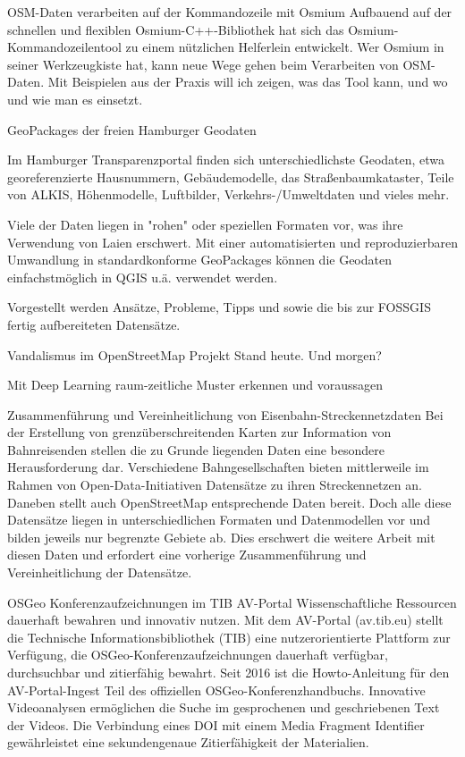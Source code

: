 %
{OSM-Daten verarbeiten auf der Kommandozeile mit Osmium}%
{}%
{Aufbauend auf der schnellen und flexiblen Osmium-C++-Bibliothek hat sich das
Osmium-Kommandozeilentool zu einem nützlichen Helferlein entwickelt. Wer Osmium in seiner
Werkzeugkiste hat, kann neue Wege gehen beim Verarbeiten von OSM-Daten. Mit Beispielen aus der
Praxis will ich zeigen, was das Tool kann, und wo und wie man es einsetzt.}

%
{GeoPackages der freien Hamburger Geodaten}%
{}%
{Im Hamburger Transparenzportal finden sich unterschiedlichste Geodaten, etwa georeferenzierte
  Hausnummern, Gebäudemodelle, das Straßenbaumkataster, Teile von ALKIS, Höhenmodelle, Luftbilder,
  Verkehrs-/Umweltdaten und vieles mehr.

Viele der Daten liegen in "rohen" oder speziellen Formaten vor, was ihre Verwendung von Laien
erschwert. Mit einer automatisierten und reproduzierbaren Umwandlung in standardkonforme GeoPackages
können die Geodaten einfachstmöglich in QGIS u.ä. verwendet werden.

Vorgestellt werden Ansätze, Probleme, Tipps und sowie die bis zur FOSSGIS fertig aufbereiteten
Datensätze.}

%
{Vandalismus im OpenStreetMap Projekt}%
{Stand heute. Und morgen?}%
{}
{}

%
{Mit Deep Learning raum-zeitliche Muster erkennen und voraussagen}%
{}%
{}

%
{Zusammenführung und Vereinheitlichung von Eisenbahn-Streckennetzdaten}%
{}%
{Bei der Erstellung von grenzüberschreitenden Karten zur Information von Bahnreisenden stellen die
zu Grunde liegenden Daten eine besondere Herausforderung dar. Verschiedene Bahngesellschaften bieten
mittlerweile im Rahmen von Open-Data-Initiativen Datensätze zu ihren Streckennetzen an. Daneben
stellt auch OpenStreetMap entsprechende Daten bereit. Doch alle diese Datensätze liegen in
unterschiedlichen Formaten und Datenmodellen vor und bilden jeweils nur begrenzte Gebiete ab. Dies
erschwert die weitere Arbeit mit diesen Daten und erfordert eine vorherige Zusammenführung und
Vereinheitlichung der Datensätze.}

%
{OSGeo Konferenzaufzeichnungen im TIB AV-Portal}%
{Wissenschaftliche Ressourcen dauerhaft bewahren und innovativ nutzen.}%
{Mit dem AV-Portal (av.tib.eu) stellt die Technische Informationsbibliothek (TIB) eine
nutzerorientierte Plattform zur Verfügung, die OSGeo-Konferenzaufzeichnungen dauerhaft verfügbar,
durchsuchbar und zitierfähig bewahrt. Seit 2016 ist die Howto-Anleitung für den AV-Portal-Ingest
Teil des offiziellen OSGeo-Konferenzhandbuchs. Innovative  Videoanalysen ermöglichen die Suche im
gesprochenen und geschriebenen Text der Videos. Die Verbindung eines DOI mit einem Media Fragment
Identifier gewährleistet eine sekundengenaue Zitierfähigkeit der Materialien. }

